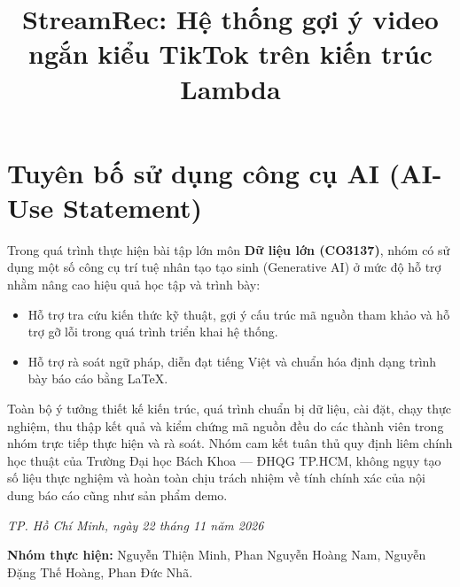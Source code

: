 \documentclass[vietnamese,final]{hcmut-thesis}
\title{StreamRec: Hệ thống gợi ý video ngắn kiểu TikTok trên kiến trúc Lambda}
\begin{document}
\coverpage

\tableofcontents
\clearpage

\mainmatter
{}







\chapter*{Tuyên bố sử dụng công cụ AI (AI-Use Statement)}

Trong quá trình thực hiện bài tập lớn môn \textbf{Dữ liệu lớn (CO3137)}, nhóm có sử dụng một số công cụ trí tuệ nhân tạo tạo sinh (Generative AI) ở mức độ hỗ trợ nhằm nâng cao hiệu quả học tập và trình bày:

\begin{itemize}
  \item Hỗ trợ tra cứu kiến thức kỹ thuật, gợi ý cấu trúc mã nguồn tham khảo và hỗ trợ gỡ lỗi trong quá trình triển khai hệ thống.
  \item Hỗ trợ rà soát ngữ pháp, diễn đạt tiếng Việt và chuẩn hóa định dạng trình bày báo cáo bằng \LaTeX.
\end{itemize}

Toàn bộ ý tưởng thiết kế kiến trúc, quá trình chuẩn bị dữ liệu, cài đặt, chạy thực nghiệm, thu thập kết quả và kiểm chứng mã nguồn đều do các thành viên trong nhóm trực tiếp thực hiện và rà soát. Nhóm cam kết tuân thủ quy định liêm chính học thuật của Trường Đại học Bách Khoa --- ĐHQG TP.HCM, không ngụy tạo số liệu thực nghiệm và hoàn toàn chịu trách nhiệm về tính chính xác của nội dung báo cáo cũng như sản phẩm demo.

\vspace{1.5em}
\noindent\textit{TP. Hồ Chí Minh, ngày 22 tháng 11 năm 2026}

\noindent\textbf{Nhóm thực hiện:} Nguyễn Thiện Minh, Phan Nguyễn Hoàng Nam, Nguyễn Đặng Thế Hoàng, Phan Đức Nhã.
\end{document}
